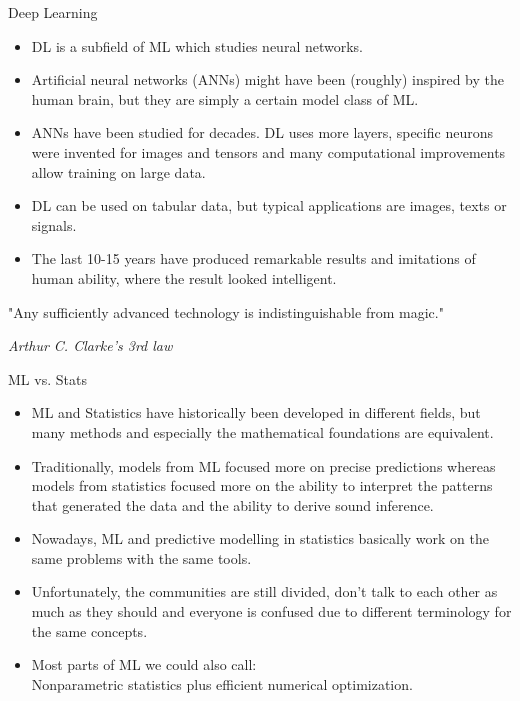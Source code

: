 \begin{vbframe}{Deep Learning}

\begin{itemize}
\item DL is a subfield of ML which studies neural networks.
\item Artificial neural networks (ANNs) might have been (roughly) inspired by the human brain, but they are simply a certain model class of ML.
\item ANNs have been studied for decades. DL uses more layers, 
        specific neurons were invented for images and tensors and many computational 
        improvements allow training on large data.
\item DL can be used on tabular data, but typical applications are images, texts or signals. 
\item The last 10-15 years have produced remarkable results and imitations of human ability, where the result looked intelligent. 
\end{itemize}

\lz

"Any sufficiently advanced technology is indistinguishable from magic."
\begin{footnotesize}
\emph{Arthur C. Clarke's 3rd law}
\end{footnotesize}
 

\end{vbframe}


\begin{frame}{ML vs. Stats}


\begin{itemize}
	\item ML and Statistics have historically been developed in different fields, but many
      methods and especially the mathematical foundations are equivalent.
	\item Traditionally, models from ML focused more on precise predictions whereas models from statistics focused more on the ability to interpret the patterns that generated the data and the ability to derive sound inference.
	\item Nowadays, ML and predictive modelling in statistics basically work on the same problems with the same tools.
    \item Unfortunately, the communities are still divided, don't talk to each other as much as they should and everyone is confused due to different terminology for the same concepts.
    \item Most parts of ML we could also call:\\Nonparametric statistics plus efficient numerical optimization.
\end{itemize}

\end{frame}


